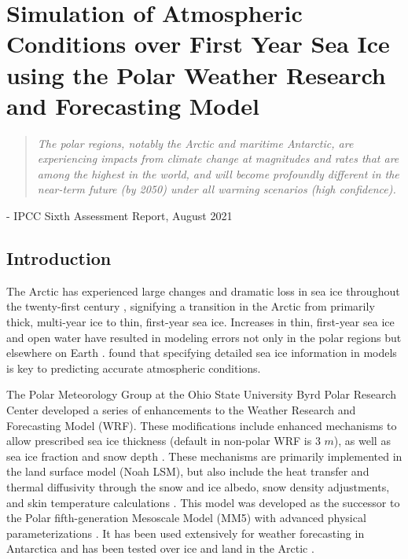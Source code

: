 \chapter{Simulation of Atmospheric Conditions over First Year Sea Ice using the Polar Weather Research and Forecasting Model}
\vspace{1 cm}
\begin{spacing}{1} \begin{quote} 
\noindent \emph{The polar regions, notably the Arctic and maritime Antarctic, are experiencing impacts from climate change at magnitudes and rates that are among the highest in the world, and will become profoundly different in the near-term future (by 2050) under all warming scenarios (high confidence).}\end{quote}
\hspace{6 cm} - IPCC Sixth Assessment Report, August 2021  
\end{spacing}
\vspace{1 cm}

\doublespacing
\section{Introduction}
The Arctic has experienced large changes and dramatic loss in sea ice throughout the twenty-first century \citep{hines:2015}, signifying a transition in the Arctic from primarily thick, multi-year ice to thin, first-year sea ice. Increases in thin, first-year sea ice and open water have resulted in modeling errors not only in the polar regions but elsewhere on Earth \citep{hines:2015, royer:1990, francis:2009}. \citet{rinke:2006} found that specifying detailed sea ice information in models is key to predicting accurate atmospheric conditions. 

The Polar Meteorology Group at the Ohio State University Byrd Polar Research Center developed a series of enhancements to the Weather Research and Forecasting Model (WRF). These modifications include enhanced mechanisms to allow prescribed sea ice thickness (default in non-polar WRF is 3 $m$), as well as sea ice fraction and snow depth \citep{hines:2015}. These mechanisms are primarily implemented in the land surface model (Noah LSM), but also include the heat transfer and thermal diffusivity through the snow and ice albedo, snow density adjustments, and skin temperature calculations \citep{tastula:2012, hines:2015}. This model was developed as the successor to the Polar fifth-generation Mesoscale Model (MM5) with advanced physical parameterizations \citep{bromwich:2009}. It has been used extensively for weather forecasting in Antarctica \citep{powers:2012} and has been tested over ice and land in the Arctic \citep{tastula:2012, bromwich:2009}. 

